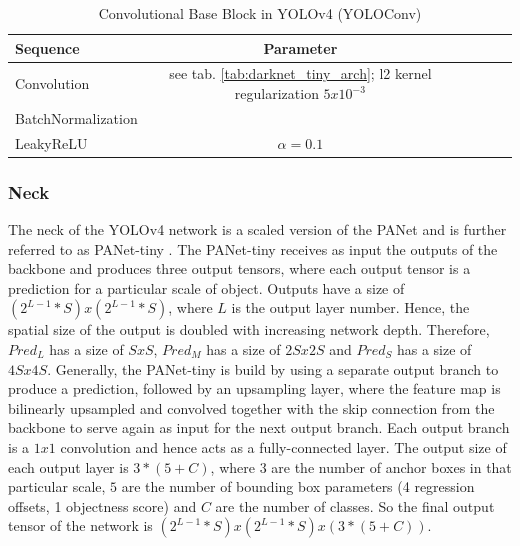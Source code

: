 \begin{table} %
\begin{center}

\begin{tabular}{l|c|c|c|c|c}
    \textbf{Sequence} & \textbf{Parameter}\\
    \hline
    Convolution & see tab. \ref{tab:darknet_tiny_arch}; l2 kernel regularization $5x10^{-3}$\\
    BatchNormalization &\\
    LeakyReLU & $\alpha = 0.1$\\

\end{tabular}
\caption{Convolutional Base Block in YOLOv4 (YOLOConv)}
\label{tab:yoloconv}

\end{center}
\end{table}

\subsubsection{Neck}

The neck of the \ac{YOLOv4} network is a scaled version of the \ac{PANet} \cite{pannet} and is further referred to as PANet-tiny \cite{yolov4_tiny}.
The PANet-tiny receives as input the outputs of the backbone and produces three output tensors, where each output tensor is a prediction for a particular scale of object.
Outputs have a size of $(2^{L-1}*S)x(2^{L-1}*S)$, where $L$ is the output layer number.
Hence, the spatial size of the output is doubled with increasing network depth.
Therefore, $Pred_L$ has a size of $SxS$, $Pred_M$ has a size of $2Sx2S$ and $Pred_S$ has a size of $4Sx4S$.
Generally, the PANet-tiny is build by using a separate output branch to produce a prediction, followed by an upsampling layer, where the feature map is bilinearly upsampled and convolved together with the skip connection from the backbone to serve again as input for the next output branch.
Each output branch is a $1x1$ convolution and hence acts as a fully-connected layer.
The output size of each output layer is $3*(5+C)$, where $3$ are the number of anchor boxes in that particular scale, $5$ are the number of bounding box parameters (4 regression offsets, 1 objectness score) and $C$ are the number of classes.
So the final output tensor of the network is $(2^{L-1}*S)x(2^{L-1}*S)x(3*(5+C))$.


